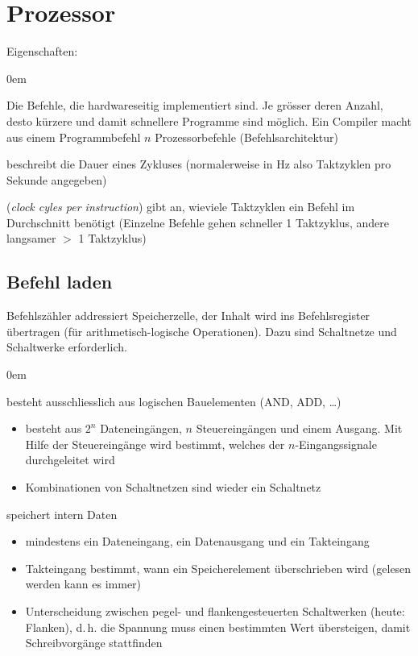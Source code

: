 \section{Prozessor}
Eigenschaften:
\begin{description}\itemsep0em
	\item [Befehlssatz] Die Befehle, die hardwareseitig implementiert sind. Je grösser deren Anzahl, desto kürzere und damit schnellere Programme sind möglich. Ein Compiler macht aus einem Programmbefehl $n$ Prozessorbefehle (Befehlsarchitektur)
	\item [Taktzyklus] beschreibt die Dauer eines Zykluses (normalerweise in Hz also Taktzyklen pro Sekunde angegeben)
	\item [Taktzyklen pro Befehl (CPI)] (\textit{clock cyles per instruction}) gibt an, wieviele Taktzyklen ein Befehl im Durchschnitt benötigt (Einzelne Befehle gehen schneller 1 Taktzyklus, andere langsamer $>$ 1 Taktzyklus)
\end{description}

\subsection{Befehl laden}
Befehlszähler addressiert Speicherzelle, der Inhalt wird ins Befehlsregister übertragen
(für arithmetisch-logische Operationen). Dazu sind Schaltnetze und Schaltwerke erforderlich.
\begin{description}\itemsep0em
	\item [Schaltnetz] besteht ausschliesslich aus logischen Bauelementen (AND, ADD, \dots)
	\begin{itemize}\itemsep0em
		\item besteht aus $2^n$ Dateneingängen, $n$ Steuereingängen und einem Ausgang. 	Mit Hilfe der Steuereingänge wird bestimmt, welches der $n$-Eingangssignale durchgeleitet wird
		\item Kombinationen von Schaltnetzen sind wieder ein Schaltnetz
	\end{itemize}

	\item [Schaltwerk] speichert intern Daten
	\begin{itemize}\itemsep0em
		\item mindestens ein Dateneingang, ein Datenausgang und ein Takteingang
		\item Takteingang bestimmt, wann ein Speicherelement überschrieben wird (gelesen werden kann es immer)
		\item Unterscheidung zwischen pegel- und flankengesteuerten Schaltwerken (heute: Flanken), d.\,h. die Spannung muss einen bestimmten Wert übersteigen, damit Schreibvorgänge stattfinden
	\end{itemize}	
\end{description}

